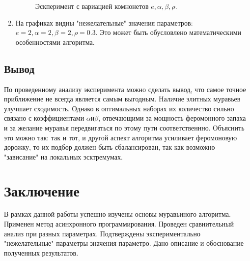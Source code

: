 \documentclass[12pt]{report}
\begin{document}
\begin{enumerate}
\begin{figure}[h]
		\caption{Эскперимент с вариацией комнонетов $e, \alpha, \beta, \rho$.}
	\end{figure}
	\item На графиках видны "нежелательные" значения параметров: $e = 2, \alpha = 2, \beta = 2, \rho = 0.3$. Это может быть обусловлено математическими особенностями алгоритма.
\end{enumerate}  
 
 \section*{Вывод}
По проведенному анализу  эксперимента можно сделать вывод, что самое точное приближение не всегда является самым выгодным. Наличие элитных муравьев улучшает сходимость. Однако в оптимальных наборах их количество сильно связано с коэффициентами $\alpha и \beta$, отвечающими за мощность феромонного запаха и за желание муравья передвигаться по этому пути соответственнно. Объяснить это можно так: так и тот, и другой аспект алгоритма усиливает феромоновую дорожку, то их подбор должен быть сбалансирован, так как возможно "зависание" на локальных эсктремумах.
 
\newpage
\chapter*{Заключение}
В рамках данной работы успешно изучены основы муравьиного алгоритма. Применен метод асинхронного программирования. Проведен сравнительный анализ при разных параметрах. Подтверждены экспериментально "нежелательные" параметры значения параметро. Дано описание и обоснование полученных результатов.   
\end{document}
